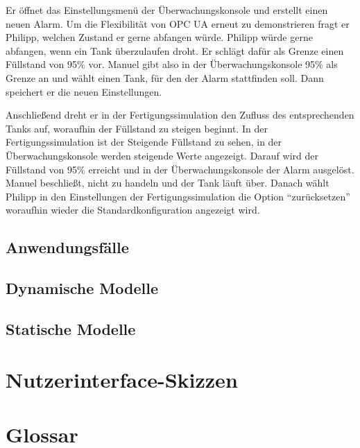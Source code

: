 \documentclass[parskip=full]{scrartcl}
\begin{document}
Er \"offnet das Einstellungsmen\"u der \"Uberwachungskonsole und erstellt einen neuen Alarm. Um die Flexibilit\"at
von OPC UA erneut zu demonstrieren fragt er Philipp, welchen Zustand er gerne abfangen w\"urde. Philipp w\"urde gerne
abfangen, wenn ein Tank \"uberzulaufen droht. Er schl\"agt daf\"ur als Grenze einen F\"ullstand von 95\% vor.
Manuel gibt also in der \"Uberwachungskonsole 95\% als Grenze an und w\"ahlt einen Tank, f\"ur den der Alarm stattfinden soll.
Dann speichert er die neuen Einstellungen.

Anschlie{\ss}end dreht er in der Fertigungssimulation den Zufluss des entsprechenden Tanks auf, woraufhin der F\"ullstand
zu steigen beginnt. In der Fertigungssimulation ist der Steigende F\"ullstand zu sehen, in der \"Uberwachungskonsole werden
steigende Werte angezeigt.
Darauf wird der F\"ullstand von 95\% erreicht und in der \"Uberwachungskonsole der Alarm ausgel\"ost. Manuel
beschlie{\ss}t, nicht zu handeln und der Tank l\"auft \"uber. Danach w\"ahlt Philipp in den Einstellungen der
Fertigungssimulation die Option ``zur\"ucksetzen'' woraufhin wieder die Standardkonfiguration angezeigt wird.

\subsection{Anwendungsfälle}
\Blindtext[1]

\subsection{Dynamische Modelle}
\Blindtext[1]

\subsection{Statische Modelle}
\Blindtext[1]

\section{Nutzerinterface-Skizzen}
\Blindtext[1]

\section{Glossar}
\Blindtext[1]
\end{document}
